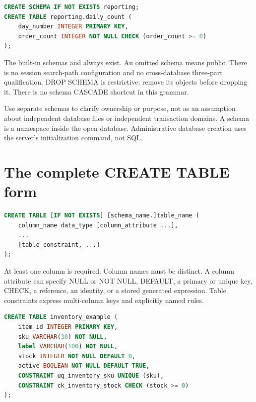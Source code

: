 \begin{lstlisting}[language=SQL]
CREATE SCHEMA IF NOT EXISTS reporting;
CREATE TABLE reporting.daily_count (
    day_number INTEGER PRIMARY KEY,
    order_count INTEGER NOT NULL CHECK (order_count >= 0)
);
\end{lstlisting}

The built-in schemas  and  always exist. An omitted schema means public. There is no session search-path configuration and no cross-database three-part qualification. DROP SCHEMA is restrictive: remove its objects before dropping it. There is no schema CASCADE shortcut in this grammar.

Use separate schemas to clarify ownership or purpose, not as an assumption about independent database files or independent transaction domains. A schema is a namespace inside the open database. Administrative database creation uses the server's initialization command, not  SQL.


\section{The complete CREATE TABLE form}

\begin{lstlisting}[language=SQL]
CREATE TABLE [IF NOT EXISTS] [schema_name.]table_name (
    column_name data_type [column_attribute ...],
    ...
    [table_constraint, ...]
);
\end{lstlisting}

At least one column is required. Column names must be distinct. A column attribute can specify NULL or NOT NULL, DEFAULT, a primary or unique key, CHECK, a reference, an identity, or a stored generated expression. Table constraints express multi-column keys and explicitly named rules.

\begin{lstlisting}[language=SQL]
CREATE TABLE inventory_example (
    item_id INTEGER PRIMARY KEY,
    sku VARCHAR(30) NOT NULL,
    label VARCHAR(100) NOT NULL,
    stock INTEGER NOT NULL DEFAULT 0,
    active BOOLEAN NOT NULL DEFAULT TRUE,
    CONSTRAINT uq_inventory_sku UNIQUE (sku),
    CONSTRAINT ck_inventory_stock CHECK (stock >= 0)
);
\end{lstlisting}

